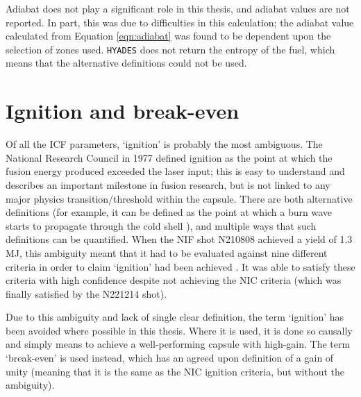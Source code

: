 Adiabat does not play a significant role in this thesis, and adiabat values are not reported. In part, this was due to difficulties in this calculation; the adiabat value calculated from Equation \ref{eqn:adiabat} was found to be dependent upon the selection of zones used. \texttt{HYADES} does not return the entropy of the fuel, which means that the alternative definitions could not be used.


\section{Ignition and break-even}
Of all the ICF parameters, `ignition' is probably the most ambiguous. The National Research Council in 1977 defined ignition as the point at which the fusion energy produced exceeded the laser input; this is easy to understand and describes an important milestone in fusion research, but is not linked to any major physics transition/threshold within the capsule. There are both alternative definitions (for example, it can be defined as the point at which a burn wave starts to propagate through the cold shell \cite{Christopherson2020}), and multiple ways that such definitions can be quantified. When the NIF shot N210808 achieved a yield of 1.3 MJ, this ambiguity meant that it had to be evaluated against nine different criteria in order to claim `ignition' had been achieved \cite{Abu-Shawareb2022}. It was able to satisfy these criteria with high confidence despite not achieving the NIC criteria (which was finally satisfied by the N221214 shot).

Due to this ambiguity and lack of single clear definition, the term `ignition' has been avoided where possible in this thesis. Where it is used, it is done so causally and simply means to achieve a well-performing capsule with high-gain. The term `break-even' is used instead, which has an agreed upon definition of a gain of unity (meaning that it is the same as the NIC ignition criteria, but without the ambiguity).